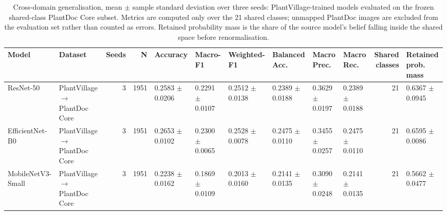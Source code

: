 \begin{table}[htbp]
\caption{Cross-domain generalisation, mean $\pm$ sample standard deviation over three seeds: PlantVillage-trained models evaluated on the frozen shared-class PlantDoc Core subset. Metrics are computed only over the 21 shared classes; unmapped PlantDoc images are excluded from the evaluation set rather than counted as errors. Retained probability mass is the share of the source model's belief falling inside the shared space before renormalisation.}
\label{tab:cross-domain}
\begin{tabular}{llrrllllllrl}
\toprule
Model & Dataset & Seeds & N & Accuracy & Macro-F1 & Weighted-F1 & Balanced Acc. & Macro Prec. & Macro Rec. & Shared classes & Retained prob. mass \\
\midrule
ResNet-50 & PlantVillage $\rightarrow$ PlantDoc Core & 3 & 1951 & 0.2583 $\pm$ 0.0206 & 0.2291 $\pm$ 0.0107 & 0.2512 $\pm$ 0.0138 & 0.2389 $\pm$ 0.0188 & 0.3629 $\pm$ 0.0197 & 0.2389 $\pm$ 0.0188 & 21 & 0.6367 $\pm$ 0.0945 \\
EfficientNet-B0 & PlantVillage $\rightarrow$ PlantDoc Core & 3 & 1951 & 0.2653 $\pm$ 0.0102 & 0.2300 $\pm$ 0.0065 & 0.2528 $\pm$ 0.0078 & 0.2475 $\pm$ 0.0110 & 0.3455 $\pm$ 0.0257 & 0.2475 $\pm$ 0.0110 & 21 & 0.6595 $\pm$ 0.0086 \\
MobileNetV3-Small & PlantVillage $\rightarrow$ PlantDoc Core & 3 & 1951 & 0.2238 $\pm$ 0.0162 & 0.1869 $\pm$ 0.0109 & 0.2013 $\pm$ 0.0160 & 0.2141 $\pm$ 0.0135 & 0.3090 $\pm$ 0.0248 & 0.2141 $\pm$ 0.0135 & 21 & 0.5662 $\pm$ 0.0477 \\
\bottomrule
\end{tabular}
\end{table}
